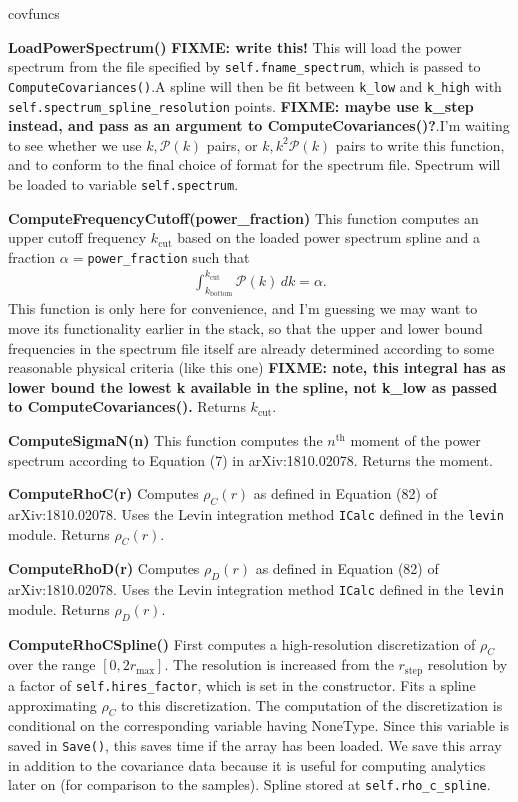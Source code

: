 \documentclass[10pt,a4paper]{article}
\begin{document}
\begin{labeling}{covfuncs}
	\item[\textbf{LoadPowerSpectrum()}] \textbf{FIXME: write this!} This will load
	the power spectrum from the file specified by \verb|self.fname_spectrum|, which is passed to \verb|ComputeCovariances()|.A spline will then be fit between \verb|k_low| and \verb|k_high| with \verb|self.spectrum_spline_resolution| points. \textbf{FIXME: maybe use k\_step instead, and pass as an argument to ComputeCovariances()?}.I'm waiting to see whether we use $k,\mathcal{P}(k)$ pairs, or $k,k^2\mathcal{P}(k)$ pairs to write this function, and to conform to the final choice of format for the spectrum file. Spectrum will be loaded to variable \verb|self.spectrum|.
	
	\item[\textbf{ComputeFrequencyCutoff(power\_fraction)}] This function computes an upper cutoff frequency $k_\mathrm{cut}$ based on the loaded power spectrum spline and a fraction $\alpha=$\verb|power_fraction| such that
	\begin{align}
		\int_{k_\mathrm{bottom}}^{k_\mathrm{cut}} \mathcal{P}(k)\, dk = \alpha.
	\end{align}
	This function is only here for convenience, and I'm guessing we may want to move its functionality earlier in the stack, so that the upper and lower bound frequencies in the spectrum file itself are already determined according to some reasonable physical criteria (like this one)
	\textbf{FIXME: note, this integral has as lower bound the lowest k available in the spline, not k\_low as passed to ComputeCovariances().} Returns $k_\text{cut}$.
	
	\item[\textbf{ComputeSigmaN(n)}] This function computes the $n^\text{th}$ moment of the power spectrum according to Equation (7) in arXiv:1810.02078. Returns the moment.
	
	\item[\textbf{ComputeRhoC(r)}] Computes $\rho_C(r)$ as defined in Equation (82) of arXiv:1810.02078. Uses the Levin integration method \verb|ICalc| defined in the \verb|levin| module. Returns $\rho_C(r)$.
	
	\item[\textbf{ComputeRhoD(r)}] Computes $\rho_D(r)$ as defined in Equation (82) of arXiv:1810.02078. Uses the Levin integration method \verb|ICalc| defined in the \verb|levin| module. Returns $\rho_D(r)$.
	
	\item[\textbf{ComputeRhoCSpline()}] First computes a high-resolution discretization of $\rho_C$  over the range $[0,2r_\text{max}]$. The resolution is increased from the $r_\text{step}$ resolution by a factor of \verb|self.hires_factor|, which is set in the constructor. Fits a spline approximating $\rho_C$ to this discretization. The computation of the discretization is conditional on the corresponding variable having NoneType. Since this variable is saved in \verb|Save()|, this saves time if the array has been loaded. We save this array in addition to the covariance data because it is useful for computing analytics later on (for comparison to the samples). Spline stored at \verb|self.rho_c_spline|.
	

\end{labeling}
\end{document}
